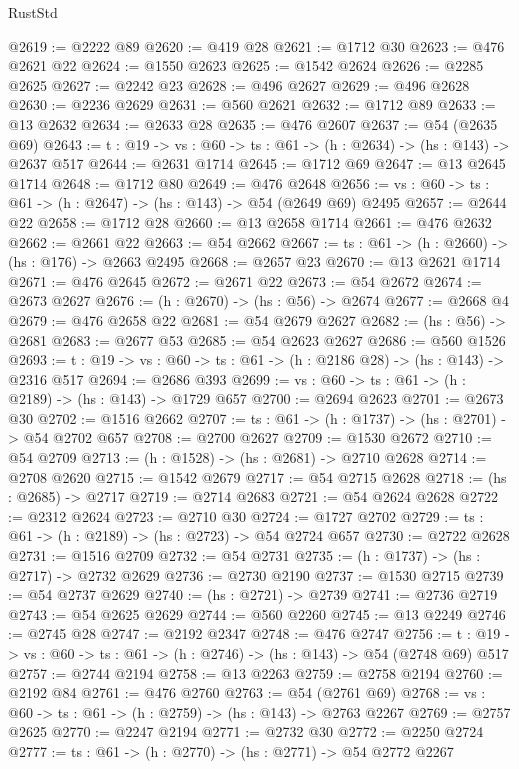 \begin{lexlean}{RustStd}
\begin{coremodule}
@2619 := @2222 @89
@2620 := @419 @28
@2621 := @1712 @30
@2623 := @476 @2621 @22
@2624 := @1550 @2623
@2625 := @1542 @2624
@2626 := @2285 @2625
@2627 := @2242 @23
@2628 := @496 @2627
@2629 := @496 @2628
@2630 := @2236 @2629
@2631 := @560 @2621
@2632 := @1712 @89
@2633 := @13 @2632
@2634 := @2633 @28
@2635 := @476 @2607
@2637 := @54 (@2635 @69)
@2643 := {t : @19} -> {vs : @60} -> {ts : @61} -> (h : @2634) -> (hs : @143) -> @2637 @517
@2644 := @2631 @1714
@2645 := @1712 @69
@2647 := @13 @2645 @1714
@2648 := @1712 @80
@2649 := @476 @2648
@2656 := {vs : @60} -> {ts : @61} -> (h : @2647) -> (hs : @143) -> @54 (@2649 @69) @2495
@2657 := @2644 @22
@2658 := @1712 @28
@2660 := @13 @2658 @1714
@2661 := @476 @2632
@2662 := @2661 @22
@2663 := @54 @2662
@2667 := {ts : @61} -> (h : @2660) -> (hs : @176) -> @2663 @2495
@2668 := @2657 @23
@2670 := @13 @2621 @1714
@2671 := @476 @2645
@2672 := @2671 @22
@2673 := @54 @2672
@2674 := @2673 @2627
@2676 := (h : @2670) -> (hs : @56) -> @2674
@2677 := @2668 @4
@2679 := @476 @2658 @22
@2681 := @54 @2679 @2627
@2682 := (hs : @56) -> @2681
@2683 := @2677 @53
@2685 := @54 @2623 @2627
@2686 := @560 @1526
@2693 := {t : @19} -> {vs : @60} -> {ts : @61} -> (h : @2186 @28) -> (hs : @143) -> @2316 @517
@2694 := @2686 @393
@2699 := {vs : @60} -> {ts : @61} -> (h : @2189) -> (hs : @143) -> @1729 @657
@2700 := @2694 @2623
@2701 := @2673 @30
@2702 := @1516 @2662
@2707 := {ts : @61} -> (h : @1737) -> (hs : @2701) -> @54 @2702 @657
@2708 := @2700 @2627
@2709 := @1530 @2672
@2710 := @54 @2709
@2713 := (h : @1528) -> (hs : @2681) -> @2710 @2628
@2714 := @2708 @2620
@2715 := @1542 @2679
@2717 := @54 @2715 @2628
@2718 := (hs : @2685) -> @2717
@2719 := @2714 @2683
@2721 := @54 @2624 @2628
@2722 := @2312 @2624
@2723 := @2710 @30
@2724 := @1727 @2702
@2729 := {ts : @61} -> (h : @2189) -> (hs : @2723) -> @54 @2724 @657
@2730 := @2722 @2628
@2731 := @1516 @2709
@2732 := @54 @2731
@2735 := (h : @1737) -> (hs : @2717) -> @2732 @2629
@2736 := @2730 @2190
@2737 := @1530 @2715
@2739 := @54 @2737 @2629
@2740 := (hs : @2721) -> @2739
@2741 := @2736 @2719
@2743 := @54 @2625 @2629
@2744 := @560 @2260
@2745 := @13 @2249
@2746 := @2745 @28
@2747 := @2192 @2347
@2748 := @476 @2747
@2756 := {t : @19} -> {vs : @60} -> {ts : @61} -> (h : @2746) -> (hs : @143) -> @54 (@2748 @69) @517
@2757 := @2744 @2194
@2758 := @13 @2263
@2759 := @2758 @2194
@2760 := @2192 @84
@2761 := @476 @2760
@2763 := @54 (@2761 @69)
@2768 := {vs : @60} -> {ts : @61} -> (h : @2759) -> (hs : @143) -> @2763 @2267
@2769 := @2757 @2625
@2770 := @2247 @2194
@2771 := @2732 @30
@2772 := @2250 @2724
@2777 := {ts : @61} -> (h : @2770) -> (hs : @2771) -> @54 @2772 @2267

\end{coremodule}
\end{lexlean}
